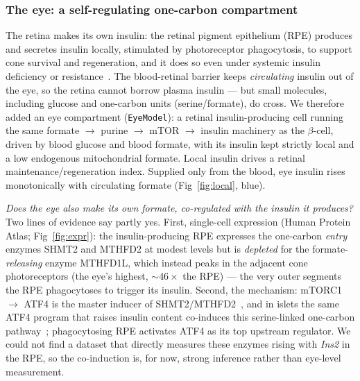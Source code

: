 \documentclass[10pt,letterpaper]{article}
\begin{document}
\subsubsection*{The eye: a self-regulating one-carbon compartment}
The retina makes its own insulin: the retinal pigment epithelium (RPE) produces
and secretes insulin locally, stimulated by photoreceptor phagocytosis, to
support cone survival and regeneration, and it does so even under systemic insulin
deficiency or resistance~\cite{etchegaray2023}. The blood-retinal
barrier keeps \emph{circulating} insulin out of the eye, so the retina cannot
borrow plasma insulin --- but small molecules, including glucose and one-carbon
units (serine/formate), do cross. We therefore added an eye compartment
(\texttt{EyeModel}): a retinal insulin-producing cell running the same
formate $\rightarrow$ purine $\rightarrow$ mTOR $\rightarrow$ insulin machinery as the
$\beta$-cell, driven by blood glucose and blood formate, with its insulin kept
strictly local and a low endogenous mitochondrial formate. Local insulin drives a
retinal maintenance/regeneration index. Supplied only from the blood, eye insulin
rises monotonically with circulating formate (Fig~\ref{fig:local}, blue).

\emph{Does the eye also make its own formate, co-regulated with the insulin it
produces?} Two lines of evidence say partly yes. First, single-cell expression
(Human Protein Atlas; Fig~\ref{fig:expr}): the insulin-producing RPE expresses
the one-carbon \emph{entry} enzymes SHMT2 and MTHFD2 at modest levels but is
\emph{depleted} for the formate-\emph{releasing} enzyme MTHFD1L, which instead
peaks in the adjacent cone photoreceptors (the eye's highest, ${\sim}46\times$ the
RPE) --- the very outer segments the RPE phagocytoses to trigger its insulin.
Second, the mechanism: mTORC1 $\rightarrow$ ATF4 is the master inducer of
SHMT2/MTHFD2~\cite{bensahra2016}, and in islets the same ATF4
program that raises insulin content co-induces this serine-linked one-carbon
pathway~\cite{pelligra2023}; phagocytosing RPE activates ATF4 as its
top upstream regulator. We could not find a dataset that directly measures these
enzymes rising with \textit{Ins2} in the RPE, so the co-induction is, for now,
strong inference rather than eye-level measurement.
\end{document}
